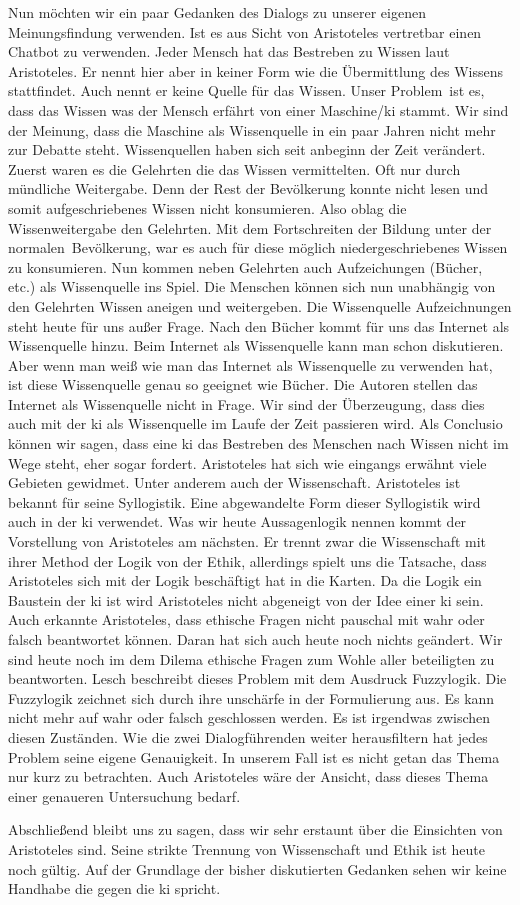 Nun möchten wir ein paar Gedanken des Dialogs zu unserer eigenen Meinungsfindung verwenden. Ist es aus Sicht von Aristoteles vertretbar einen Chatbot zu verwenden. Jeder Mensch hat das Bestreben zu Wissen laut Aristoteles. Er nennt hier aber in keiner Form wie die Übermittlung des Wissens stattfindet. Auch nennt er keine Quelle für das Wissen. Unser \glqq Problem\grqq\ ist es, dass das Wissen was der Mensch erfährt von einer Maschine/\ac{ki} stammt. Wir sind der Meinung, dass die Maschine als Wissenquelle in ein paar Jahren nicht mehr zur Debatte steht. Wissenquellen haben sich seit anbeginn der Zeit verändert. Zuerst waren es die Gelehrten die das Wissen vermittelten. Oft nur durch mündliche Weitergabe. Denn der Rest der Bevölkerung konnte nicht lesen und somit aufgeschriebenes Wissen nicht konsumieren. Also oblag die Wissenweitergabe den Gelehrten. Mit dem Fortschreiten der Bildung unter der \glqq normalen\grqq\ Bevölkerung, war es auch für diese möglich niedergeschriebenes Wissen zu konsumieren. Nun kommen neben Gelehrten auch Aufzeichungen (Bücher, etc.) als Wissenquelle ins Spiel. Die Menschen können sich nun unabhängig von den Gelehrten Wissen aneigen und weitergeben. Die Wissenquelle Aufzeichnungen steht heute für uns außer Frage. Nach den Bücher kommt für uns das Internet als Wissenquelle hinzu. Beim Internet als Wissenquelle kann man schon diskutieren. Aber wenn man weiß wie man das Internet als Wissenquelle zu verwenden hat, ist diese Wissenquelle genau so geeignet wie Bücher. Die Autoren stellen das Internet als Wissenquelle nicht in Frage. Wir sind der Überzeugung, dass dies auch mit der \ac{ki} als Wissenquelle im Laufe der Zeit passieren wird. Als Conclusio können wir sagen, dass eine \ac{ki} das Bestreben des Menschen nach Wissen nicht im Wege steht, eher sogar fordert. \newline
Aristoteles hat sich wie eingangs erwähnt viele Gebieten gewidmet. Unter anderem auch der Wissenschaft. Aristoteles ist bekannt für seine Syllogistik. Eine abgewandelte Form dieser Syllogistik wird auch in der \ac{ki} verwendet. Was wir heute Aussagenlogik nennen kommt der Vorstellung von Aristoteles am nächsten. Er trennt zwar die Wissenschaft mit ihrer Method der Logik von der Ethik, allerdings spielt uns die Tatsache, dass Aristoteles sich mit der Logik beschäftigt hat in die Karten. Da die Logik ein Baustein der \ac{ki} ist wird Aristoteles nicht abgeneigt von der Idee einer \ac{ki} sein. \newline
Auch erkannte Aristoteles, dass ethische Fragen nicht pauschal mit wahr oder falsch beantwortet können. Daran hat sich auch heute noch nichts geändert. Wir sind heute noch im dem Dilema ethische Fragen zum Wohle aller beteiligten zu beantworten. Lesch beschreibt dieses Problem mit dem Ausdruck Fuzzylogik. Die Fuzzylogik zeichnet sich durch ihre unschärfe in der Formulierung aus. Es kann nicht mehr auf wahr oder falsch geschlossen werden. Es ist irgendwas zwischen diesen Zuständen. \newline
Wie die zwei Dialogführenden weiter herausfiltern hat jedes Problem seine eigene Genauigkeit. In unserem Fall ist es nicht getan das Thema nur kurz zu betrachten. Auch Aristoteles wäre der Ansicht, dass dieses Thema einer genaueren Untersuchung bedarf.

Abschließend bleibt uns zu sagen, dass wir sehr erstaunt über die Einsichten von Aristoteles sind. Seine strikte Trennung von Wissenschaft und Ethik ist heute noch gültig. Auf der Grundlage der bisher diskutierten Gedanken sehen wir keine Handhabe die gegen die \ac{ki} spricht. 


